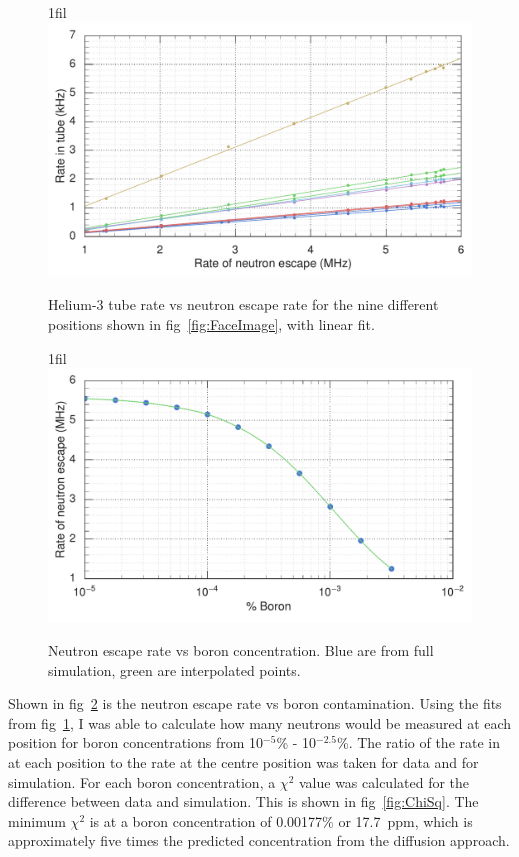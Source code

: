 \documentclass{article}
\makeatletter
\newcommand*{\centerfloat}{%
  \parindent \z@
  \leftskip \z@ \@plus 1fil \@minus \textwidth
  \rightskip\leftskip
  \parfillskip \z@skip}
\makeatother
\begin{document}
\begin{figure}
	\centerfloat
	\includegraphics[width=\columnwidth]{images/TubeRateVsEscapeRate}
	\caption{Helium-3 tube rate vs neutron escape rate for the nine different positions shown in fig~\ref{fig:FaceImage}, with linear fit.}	
	\label{fig:TubeRateVsEscape}
\end{figure}

\begin{figure}
	\centerfloat
	\includegraphics[width=\columnwidth]{images/EscapeRateVsBoron}
	\caption{Neutron escape rate vs boron concentration. Blue are from full simulation, green are interpolated points.}	
	\label{fig:EscapeRate}
\end{figure}



Shown in fig~\ref{fig:EscapeRate} is the neutron escape rate vs boron contamination. Using the fits from fig~\ref{fig:TubeRateVsEscape}, I was able to calculate how many neutrons would be measured at each position for boron concentrations from 10$^{-5}$\% - 10$^{-2.5}$\%. The ratio of the rate in at each position to the rate at the centre position was taken for data and for simulation. For each boron concentration, a $\chi^2$ value was calculated for the difference between data and simulation. This is shown in fig~\ref{fig:ChiSq}. The minimum $\chi^2$ is at a boron concentration of 0.00177\% or 17.7~ppm, which is approximately five times the predicted concentration from the diffusion approach.
\end{document}
